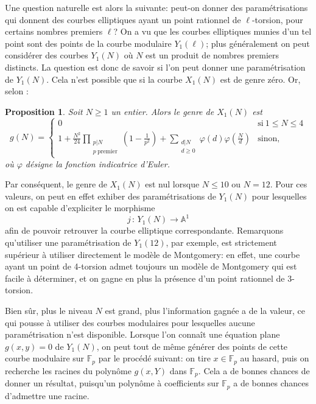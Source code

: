 \documentclass[11pt,a4paper]{article}
\newcommand{\A}{\mathbb{A}}
\newcommand{\F}{\mathbb{F}}
\newcommand{\vers}{\longrightarrow}
\newcommand{\de}{\,:\,}
\newtheorem*{prop}{Proposition}
\theoremstyle{definition}
\begin{document}
Une question naturelle est alors la suivante: peut-on donner des paramétrisations qui donnent des courbes elliptiques ayant un point rationnel de $\ell$-torsion, pour certains nombres premiers $\ell$? On a vu que les courbes elliptiques munies d'un tel point sont des points de la courbe modulaire $Y_1(\ell)$; plus généralement on peut considérer des courbes $Y_1(N)$ où $N$ est un produit de nombres premiers distincts. La question est donc de savoir si l'on peut donner une paramétrisation de $Y_1(N)$. Cela n'est possible que si la courbe $X_1(N)$ est de genre zéro. Or, selon \cite{Coreens}:

\begin{prop}
Soit $N\geq 1$ un entier. Alors le genre de $X_1(N)$ est 
$$  g(N) = 
\begin{cases}
0 &\text{si}\ 1\leq N\leq 4 \\
\displaystyle 1 + \frac{N^2}{24} \prod_{\substack{p|N \\ p\ \mathrm{premier}}} \left(1 - \frac{1}{p^2}\right) + \sum_{\substack{d|N\\ d\geq 0}} \varphi(d)\varphi\left(\frac{N}{d}\right)& \text{sinon,}
\end{cases}$$
où $\varphi$ désigne la fonction indicatrice d'Euler.
\end{prop}

Par conséquent, le genre de $X_1(N)$ est nul lorsque $N\leq 10$ ou $N = 12$. Pour ces valeurs, on peut en effet exhiber des paramétrisations de $Y_1(N)$ pour lesquelles on est capable d'expliciter le morphisme
$$j \de Y_1(N) \vers \A^1$$
afin de pouvoir retrouver la courbe elliptique correspondante. Remarquons qu'utiliser une paramétrisation de $Y_1(12)$, par exemple, est strictement supérieur à utiliser directement le modèle de Montgomery: en effet, une courbe ayant un point de 4-torsion admet toujours un modèle de Montgomery qui est facile à déterminer, et on gagne en plus la présence d'un point rationnel de 3-torsion.

Bien sûr, plus le niveau $N$ est grand, plus l'information gagnée a de la valeur, ce qui pousse à utiliser des courbes modulaires pour lesquelles aucune paramétrisation n'est disponible. Lorsque l'on connaît une équation plane $g(x, y) = 0$ de $Y_1(N)$, on peut tout de même générer des points de cette courbe modulaire sur $\F_p$ par le procédé suivant: on tire $x\in \F_p$ au hasard, puis on recherche les racines du polynôme $g(x, Y)$ dans $\F_p$. Cela a de bonnes chances de donner un résultat, puisqu'un polynôme à coefficients sur $\F_p$ a de bonnes chances d'admettre une racine.
\end{document}
